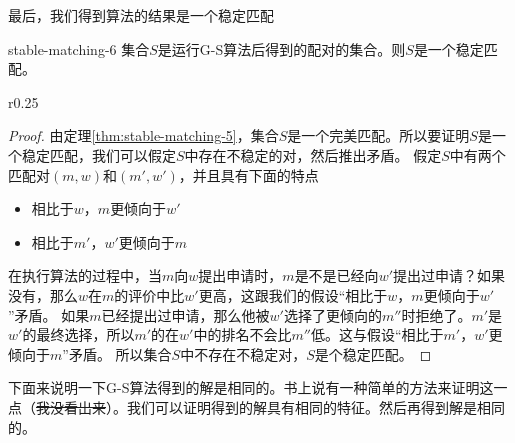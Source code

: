     最后，我们得到算法的结果是一个稳定匹配
    \begin{theorem}{}{stable-matching-6}
        集合$S$是运行G-S算法后得到的配对的集合。则$S$是一个稳定匹配。
    \end{theorem}
    \begin{wrapfigure}[6]{r}{0.25\linewidth}
        \centering
        \caption{}\label{fig:stable-matching-2}
    \end{wrapfigure}
    \begin{proof}
        由定理\ref{thm:stable-matching-5}，集合$S$是一个完美匹配。所以要证明$S$是一个稳定匹配，我们可以假定$S$中存在不稳定的对，然后推出矛盾。
        假定$S$中有两个匹配对$(m,w)$和$(m',w')$，并且具有下面的特点
        \begin{itemize}[label=$\ast$]
            \item 相比于$w$，$m$更倾向于$w'$
            \item 相比于$m'$，$w'$更倾向于$m$
        \end{itemize}
        在执行算法的过程中，当$m$向$w$提出申请时，$m$是不是已经向$w'$提出过申请？如果没有，那么$w$在$m$的评价中比$w'$更高，这跟我们的假设“相比于$w$，$m$更倾向于$w'$”矛盾。
        如果$m$已经提出过申请，那么他被$w'$选择了更倾向的$m''$时拒绝了。$m'$是$w'$的最终选择，所以$m'$的在$w'$中的排名不会比$m''$低。这与假设“相比于$m'$，$w'$更倾向于$m$”矛盾。
        所以集合$S$中不存在不稳定对，$S$是个稳定匹配。
    \end{proof}
    下面来说明一下G-S算法得到的解是相同的。书上说有一种简单的方法来证明这一点（\sout{我没看出来}）。我们可以证明得到的解具有相同的特征。然后再得到解是相同的。

